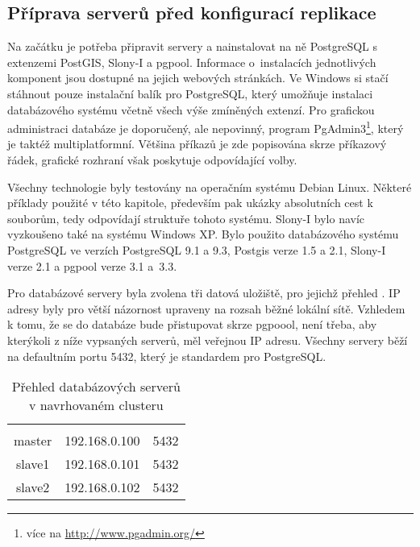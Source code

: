       \subsection{Příprava serverů před konfigurací replikace}
      \label{kPriprava}
      Na začátku je potřeba připravit servery a nainstalovat na ně PostgreSQL s extenzemi PostGIS, Slony-I a pgpool. Informace o~instalacích jednotlivých komponent jsou dostupné na jejich webových stránkách. Ve Windows si stačí stáhnout pouze instalační balík pro PostgreSQL, který umožňuje instalaci databázového systému včetně všech výše zmíněných extenzí. Pro grafickou administraci databáze je doporučený, ale nepovinný, program \mbox{PgAdmin3}\footnote{více na \url{http://www.pgadmin.org/}}, který je taktéž multiplatformní. Většina příkazů je zde popisována skrze příkazový řádek, grafické rozhraní však poskytuje odpovídající volby.

Všechny technologie byly testovány na operačním systému Debian Linux. Některé příklady použité v této kapitole, především pak ukázky absolutních cest k souborům, tedy odpovídají struktuře tohoto systému. Slony-I bylo navíc vyzkoušeno také na systému Windows XP. Bylo použito databázového systému PostgreSQL ve verzích PostgreSQL 9.1 a 9.3, Postgis verze 1.5 a 2.1, Slony-I verze 2.1 a pgpool verze 3.1 a~3.3.

Pro databázové servery byla zvolena tři datová uložiště, pro jejichž přehled . IP adresy byly pro větší názornost upraveny na rozsah běžné lokální sítě. Vzhledem k tomu, že se do databáze bude přistupovat skrze pgpoool, není třeba, aby kterýkoli z níže vypsaných serverů, měl veřejnou IP adresu. Všechny servery běží na defaultním portu 5432, který je standardem pro PostgreSQL.

        \begin{table}[H]
          \caption{Přehled databázových serverů v navrhovaném clusteru}
            \label{tServery}
            \begin{center}
            \begin{tabular}{|ccc|}
              \hline
              \color{purpurova7}{název} & \color{purpurova7}{IP adresa} & \color{purpurova7}{port}\\
                                 master& 192.168.0.100 & 5432\\
                                 slave1& 192.168.0.101 & 5432\\
                                 slave2& 192.168.0.102 & 5432\\
              \hline
              \end{tabular}
            \end{center}
        \end{table}

